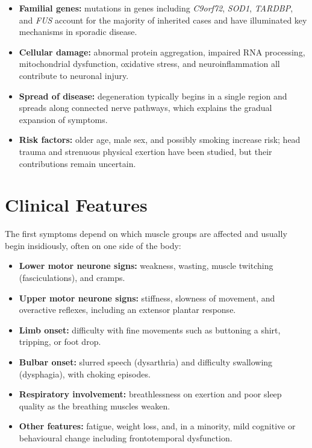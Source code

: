 \begin{itemize}
    \item \textbf{Familial genes:} mutations in genes including \textit{C9orf72}, \textit{SOD1}, \textit{TARDBP}, and \textit{FUS} account for the majority of inherited cases and have illuminated key mechanisms in sporadic disease.
    \item \textbf{Cellular damage:} abnormal protein aggregation, impaired RNA processing, mitochondrial dysfunction, oxidative stress, and neuroinflammation all contribute to neuronal injury.
    \item \textbf{Spread of disease:} degeneration typically begins in a single region and spreads along connected nerve pathways, which explains the gradual expansion of symptoms.
    \item \textbf{Risk factors:} older age, male sex, and possibly smoking increase risk; head trauma and strenuous physical exertion have been studied, but their contributions remain uncertain.
\end{itemize}

\section*{Clinical Features}
The first symptoms depend on which muscle groups are affected and usually begin insidiously, often on one side of the body:

\begin{itemize}
    \item \textbf{Lower motor neurone signs:} weakness, wasting, muscle twitching (fasciculations), and cramps.
    \item \textbf{Upper motor neurone signs:} stiffness, slowness of movement, and overactive reflexes, including an extensor plantar response.
    \item \textbf{Limb onset:} difficulty with fine movements such as buttoning a shirt, tripping, or foot drop.
    \item \textbf{Bulbar onset:} slurred speech (dysarthria) and difficulty swallowing (dysphagia), with choking episodes.
    \item \textbf{Respiratory involvement:} breathlessness on exertion and poor sleep quality as the breathing muscles weaken.
    \item \textbf{Other features:} fatigue, weight loss, and, in a minority, mild cognitive or behavioural change including frontotemporal dysfunction.
\end{itemize}

